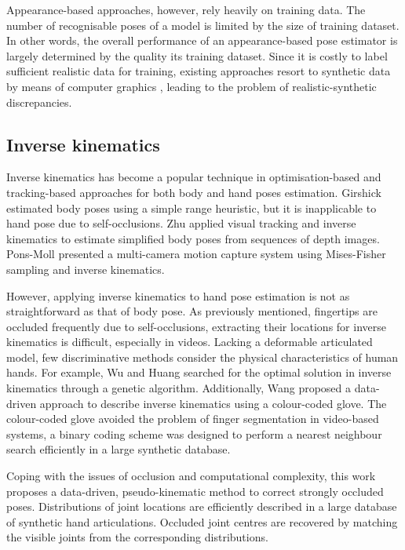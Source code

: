 Appearance-based approaches, however, rely heavily on training data. 
The number of recognisable poses of a model is limited by the size of training dataset. In other words, the overall performance of an appearance-based pose estimator is largely determined by the quality its training dataset. 
Since it is costly to label sufficient realistic data for training, existing approaches resort to synthetic data by means of computer graphics \cite{Romero2009, Keskin2012}, leading to the problem of realistic-synthetic discrepancies.

\subsection{Inverse kinematics}   
Inverse kinematics has become a popular technique in optimisation-based and tracking-based  approaches for both body and hand poses estimation. 
Girshick \etal \cite{Girshick2011} estimated body poses using a simple range heuristic, but it is inapplicable to hand pose due to self-occlusions. 
Zhu \etal \cite{Zhu2008a} applied visual tracking and inverse kinematics to estimate simplified body poses from sequences of depth images.
Pons-Moll \etal \cite{Pons-Moll2011} presented a multi-camera motion capture system using Mises-Fisher sampling and inverse kinematics.  

However, applying inverse kinematics to hand pose estimation is not as straightforward as that of body pose. As previously mentioned, fingertips are occluded frequently due to self-occlusions, extracting their locations for inverse kinematics is difficult, especially in videos. 
Lacking a deformable articulated model, few discriminative methods consider the physical characteristics of human hands. For example, Wu and Huang \cite{Wu1999} searched for the optimal solution in inverse kinematics through a genetic algorithm. Additionally, Wang \etal \cite{Wang2009} proposed a data-driven approach to describe inverse kinematics using a colour-coded glove. The colour-coded glove avoided the problem of finger segmentation in video-based systems, a binary coding scheme was designed to perform a nearest neighbour search efficiently in a large synthetic database. 

Coping with the issues of occlusion and computational complexity, this work proposes a data-driven, pseudo-kinematic method to correct strongly occluded poses. Distributions of joint locations are efficiently described in a large database of synthetic hand articulations. Occluded joint centres are recovered by matching the visible joints from the corresponding distributions.

